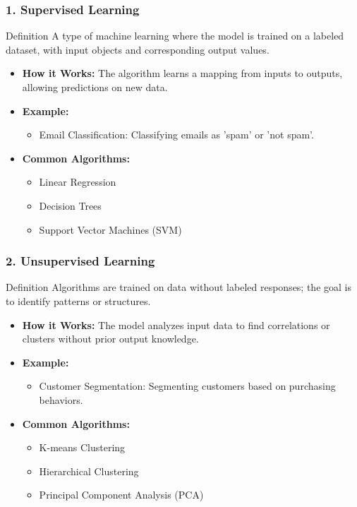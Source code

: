 \documentclass[aspectratio=169]{beamer}
\begin{document}
\begin{frame}[fragile]
    \frametitle{1. Supervised Learning}
    \begin{block}{Definition}
        A type of machine learning where the model is trained on a labeled dataset, with input objects and corresponding output values.
    \end{block}
    
    \begin{itemize}
        \item \textbf{How it Works:} The algorithm learns a mapping from inputs to outputs, allowing predictions on new data.
        \item \textbf{Example:} 
        \begin{itemize}
            \item Email Classification: Classifying emails as 'spam' or 'not spam'.
        \end{itemize}
        \item \textbf{Common Algorithms:}
        \begin{itemize}
            \item Linear Regression
            \item Decision Trees
            \item Support Vector Machines (SVM)
        \end{itemize}
    \end{itemize}
\end{frame}

\begin{frame}[fragile]
    \frametitle{2. Unsupervised Learning}
    \begin{block}{Definition}
        Algorithms are trained on data without labeled responses; the goal is to identify patterns or structures.
    \end{block}
    
    \begin{itemize}
        \item \textbf{How it Works:} The model analyzes input data to find correlations or clusters without prior output knowledge.
        \item \textbf{Example:} 
        \begin{itemize}
            \item Customer Segmentation: Segmenting customers based on purchasing behaviors.
        \end{itemize}
        \item \textbf{Common Algorithms:}
        \begin{itemize}
            \item K-means Clustering
            \item Hierarchical Clustering
            \item Principal Component Analysis (PCA)
        \end{itemize}
    \end{itemize}
\end{frame}
\end{document}
